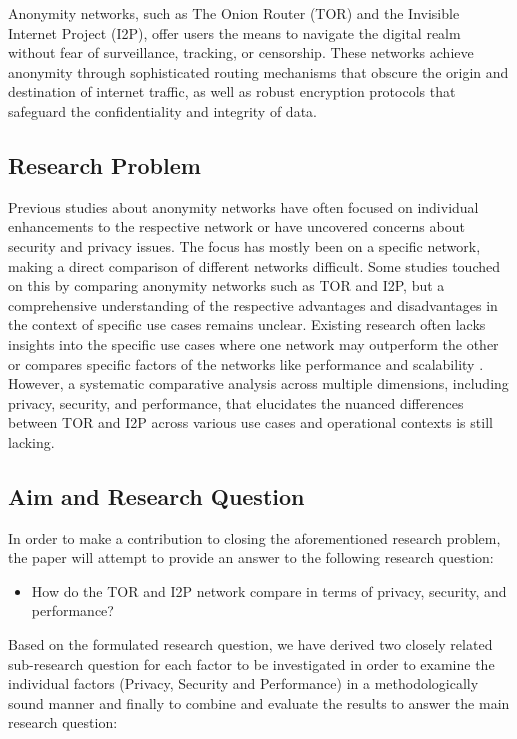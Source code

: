 \documentclass[12pt,conference]{IEEEtran}
\begin{document}
Anonymity networks, such as The Onion Router (TOR)\cite{tor} and the Invisible Internet Project (I2P)\cite{i2p}, offer users the means to navigate the digital realm without fear of surveillance, tracking, or censorship\cite{aSurveyOnTORAndI2P}. These networks achieve anonymity through sophisticated routing mechanisms that obscure the origin and destination of internet traffic, as well as robust encryption protocols that safeguard the confidentiality and integrity of data\cite{aComparativeStudyOnAnonymizingNetworks}.

\subsection{Research Problem}
Previous studies about anonymity networks have often focused on individual enhancements to the respective network\cite{aReviewOnGarlicRoutingAndArtificialIntelligenceApplicatinsInPublicNetwork} or have uncovered concerns about security and privacy issues\cite{monitoringAnAnonymityNetwork}\cite{convenientDetectionMethodForAnonymousNetworks}. The focus has mostly been on a specific network, making a direct comparison of different networks difficult. Some studies touched on this by comparing anonymity networks such as TOR and I2P, but a comprehensive understanding of the respective advantages and disadvantages in the context of specific use cases remains unclear. Existing research often lacks insights into the specific use cases where one network may outperform the other\cite{TORVsI2P}\cite{aComparativeStudyOnAnonymizingNetworks} or compares specific factors of the networks like performance and scalability \cite{I2PUsabilityVsTORUsability}\cite{aSurveyOnTORAndI2P}. However, a systematic comparative analysis across multiple dimensions, including privacy, security, and performance, that elucidates the nuanced differences between TOR and I2P across various use cases and operational contexts is still lacking. 

\subsection{Aim and Research Question}
In order to make a contribution to closing the aforementioned research problem, the paper will attempt to provide an answer to the following research question:
\begin{itemize}
	\item How do the TOR and I2P network compare in terms of privacy, security, and performance?
\end{itemize}
Based on the formulated research question, we have derived two closely related sub-research question for each factor to be investigated in order to examine the individual factors (Privacy, Security and Performance) in a methodologically sound manner and finally to combine and evaluate the results to answer the main research question:
\end{document}
